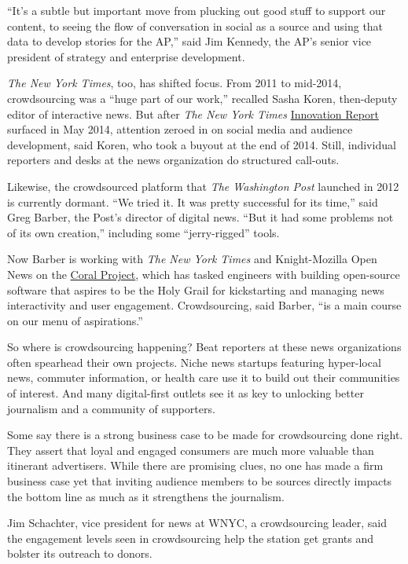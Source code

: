 \documentclass[notoc, symmetric, nobib, nols]{towcenter-guideto-book}
\begin{document}
``It's a subtle but important move from plucking out good stuff to support our content, to seeing the flow of conversation in social as a source and using that data to develop stories for the AP,'' said Jim Kennedy, the AP's senior vice president of strategy and enterprise development.%

\textit{The New York Times}, too, has shifted focus. From 2011 to mid-2014, crowdsourcing was a “huge part of our work,” recalled Sasha Koren, then-deputy editor of interactive news. But after \textit{The New York Times} \href{http://mashable.com/2014/05/16/full-new-york-times-innovation-report/#fLsAGSD30Oq4}{Innovation Report}\autocite{Innovation} surfaced in May 2014, attention zeroed in on social media and audience development, said Koren, who took a buyout at the end of 2014. Still, individual reporters and desks at the news organization do structured call-outs.

Likewise, the crowdsourced platform that \textit{The Washington Post} launched in 2012 is currently dormant. ``We tried it. It was pretty successful for its time,'' said Greg Barber, the Post's director of digital news. ``But it had some problems not of its own creation,'' including some ``jerry-rigged'' tools.%
 
Now Barber is working with \textit{The New York Times} and Knight-Mozilla Open News on the \href{https://coralproject.net/}{Coral Project},\autocite{Coral} which has tasked engineers with building open-source software that aspires to be the Holy Grail for kickstarting and managing news interactivity and user engagement. Crowdsourcing, said Barber, ``is a main course on our menu of aspirations.'' 

So where is crowdsourcing happening? Beat reporters at these news organizations often spearhead their own projects. Niche news startups featuring hyper-local news, commuter information, or health care use it to build out their communities of interest. And many digital-first outlets see it as key to unlocking better journalism and a community of supporters. 

Some say there is a strong business case to be made for crowdsourcing done right. They assert that loyal and engaged consumers are much more valuable than itinerant advertisers. While there are promising clues, no one has made a firm business case yet that inviting audience members to be sources directly impacts the bottom line as much as it strengthens the journalism.

Jim Schachter, vice president for news at WNYC, a crowdsourcing leader, said the engagement levels seen in crowdsourcing help the station get grants and bolster its outreach to donors.%
\end{document}
